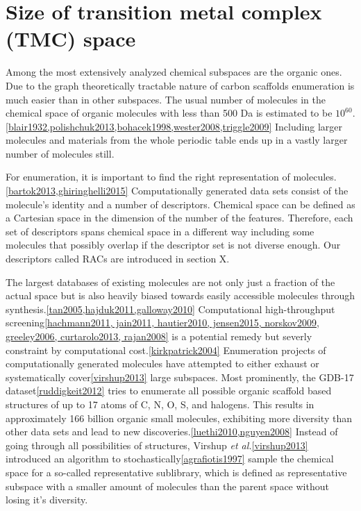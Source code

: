 \documentclass{article}
\begin{document}

\section{Size of transition metal complex (TMC) space}
Among the most extensively analyzed chemical subspaces are the organic ones. Due to the graph theoretically tractable nature of carbon scaffolds enumeration is much easier than in other subspaces. The usual number of molecules in the chemical space of organic molecules with less than 500 Da is estimated to be $10^{60}$.\ref{blair1932,polishchuk2013,bohacek1998,wester2008,triggle2009} Including larger molecules and materials from the whole periodic table ends up in a vastly larger number of molecules still.

For enumeration, it is important to find the right representation of molecules.\ref{bartok2013,ghiringhelli2015} Computationally generated data sets consist of the molecule's identity and a number of descriptors. Chemical space can be defined as a Cartesian space in the dimension of the number of the features. Therefore, each set of descriptors spans chemical space in a different way including some molecules that possibly overlap if the descriptor set is not diverse enough. Our descriptors called RACs are introduced in section X.
 
The largest databases of existing molecules are not only just a fraction of the actual space but is also heavily biased towards easily accessible molecules through synthesis.\ref{tan2005,hajduk2011,galloway2010} Computational high-throughput screening\ref{hachmann2011, jain2011, hautier2010, jensen2015, norskov2009, greeley2006, curtarolo2013, rajan2008} is a potential remedy but severly constraint by computational cost.\ref{kirkpatrick2004} Enumeration projects of computationally generated molecules have attempted to either exhaust or systematically cover\ref{virshup2013} large subspaces. Most prominently, the GDB-17 dataset\ref{ruddigkeit2012} tries to enumerate all possible organic scaffold based structures of up to 17 atoms of C, N, O, S, and halogens. This results in approximately 166 billion organic small molecules, exhibiting more diversity than other data sets and lead to new discoveries.\ref{luethi2010,nguyen2008} Instead of going through all possibilities of structures, Virshup \textit{et al.}\ref{virshup2013} introduced an algorithm to stochastically\ref{agrafiotis1997} sample the chemical space for a so-called representative sublibrary, which is defined as representative subspace with a smaller amount of molecules than the parent space without losing it's diversity.
\end{document}
